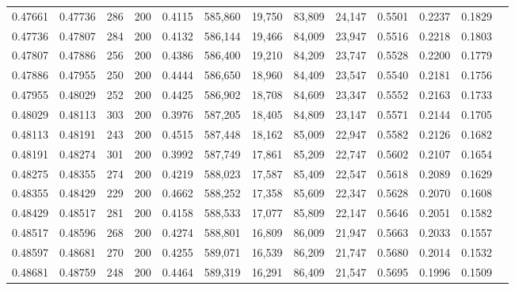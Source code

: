 \begin{tabular}{rrrrrrrrrrrrr}
0.47661 & 0.47736 &    286 & 200 &                                     0.4115 & 585,860 &  19,750 &  83,809 &  24,147 & 0.5501 & 0.2237 & 0.1829 \\
0.47736 & 0.47807 &    284 & 200 &                                     0.4132 & 586,144 &  19,466 &  84,009 &  23,947 & 0.5516 & 0.2218 & 0.1803 \\
0.47807 & 0.47886 &    256 & 200 &                                     0.4386 & 586,400 &  19,210 &  84,209 &  23,747 & 0.5528 & 0.2200 & 0.1779 \\
0.47886 & 0.47955 &    250 & 200 &                                     0.4444 & 586,650 &  18,960 &  84,409 &  23,547 & 0.5540 & 0.2181 & 0.1756 \\
0.47955 & 0.48029 &    252 & 200 &                                     0.4425 & 586,902 &  18,708 &  84,609 &  23,347 & 0.5552 & 0.2163 & 0.1733 \\
0.48029 & 0.48113 &    303 & 200 &                                     0.3976 & 587,205 &  18,405 &  84,809 &  23,147 & 0.5571 & 0.2144 & 0.1705 \\
0.48113 & 0.48191 &    243 & 200 &                                     0.4515 & 587,448 &  18,162 &  85,009 &  22,947 & 0.5582 & 0.2126 & 0.1682 \\
0.48191 & 0.48274 &    301 & 200 &                                     0.3992 & 587,749 &  17,861 &  85,209 &  22,747 & 0.5602 & 0.2107 & 0.1654 \\
0.48275 & 0.48355 &    274 & 200 &                                     0.4219 & 588,023 &  17,587 &  85,409 &  22,547 & 0.5618 & 0.2089 & 0.1629 \\
0.48355 & 0.48429 &    229 & 200 &                                     0.4662 & 588,252 &  17,358 &  85,609 &  22,347 & 0.5628 & 0.2070 & 0.1608 \\
0.48429 & 0.48517 &    281 & 200 &                                     0.4158 & 588,533 &  17,077 &  85,809 &  22,147 & 0.5646 & 0.2051 & 0.1582 \\
0.48517 & 0.48596 &    268 & 200 &                                     0.4274 & 588,801 &  16,809 &  86,009 &  21,947 & 0.5663 & 0.2033 & 0.1557 \\
0.48597 & 0.48681 &    270 & 200 &                                     0.4255 & 589,071 &  16,539 &  86,209 &  21,747 & 0.5680 & 0.2014 & 0.1532 \\
0.48681 & 0.48759 &    248 & 200 &                                     0.4464 & 589,319 &  16,291 &  86,409 &  21,547 & 0.5695 & 0.1996 & 0.1509 \\

\end{tabular}
